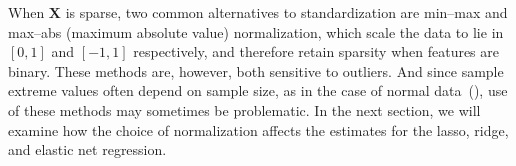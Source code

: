 When \(\bm{X}\) is sparse, two common alternatives to standardization are min--max and
max--abs (maximum absolute value) normalization, which scale the data to lie in \([0, 1]\)
and \([-1, 1]\) respectively, and therefore retain sparsity when features are binary. These
methods are, however, both sensitive to outliers. And since sample extreme values often
depend on sample size, as in the case of normal data~(), use of
these methods may sometimes be problematic. In the next section, we will examine how the
choice of normalization affects the estimates for the lasso, ridge, and elastic net
regression.

